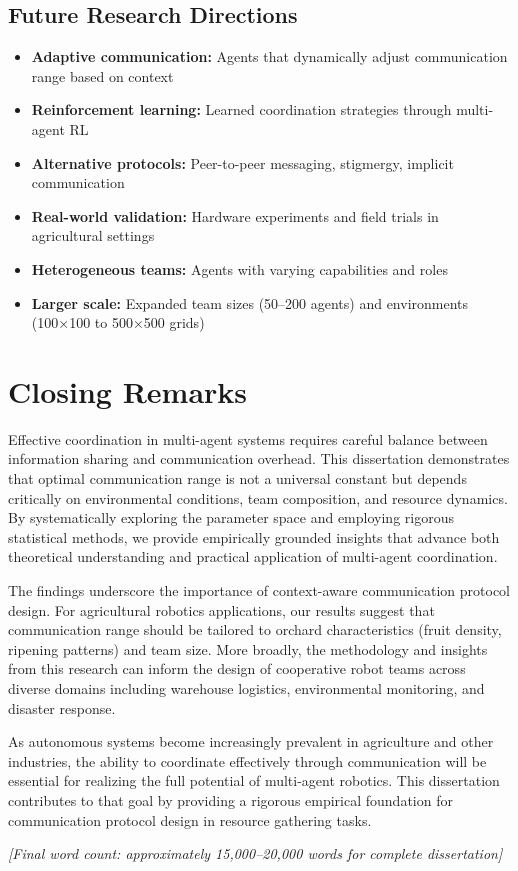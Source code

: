 \subsection{Future Research Directions}

\begin{itemize}
    \item \textbf{Adaptive communication:} Agents that dynamically adjust communication range based on context
    \item \textbf{Reinforcement learning:} Learned coordination strategies through multi-agent RL
    \item \textbf{Alternative protocols:} Peer-to-peer messaging, stigmergy, implicit communication
    \item \textbf{Real-world validation:} Hardware experiments and field trials in agricultural settings
    \item \textbf{Heterogeneous teams:} Agents with varying capabilities and roles
    \item \textbf{Larger scale:} Expanded team sizes (50--200 agents) and environments (100×100 to 500×500 grids)
\end{itemize}

\section{Closing Remarks}

Effective coordination in multi-agent systems requires careful balance between information sharing and communication overhead. This dissertation demonstrates that optimal communication range is not a universal constant but depends critically on environmental conditions, team composition, and resource dynamics. By systematically exploring the parameter space and employing rigorous statistical methods, we provide empirically grounded insights that advance both theoretical understanding and practical application of multi-agent coordination.

The findings underscore the importance of context-aware communication protocol design. For agricultural robotics applications, our results suggest that communication range should be tailored to orchard characteristics (fruit density, ripening patterns) and team size. More broadly, the methodology and insights from this research can inform the design of cooperative robot teams across diverse domains including warehouse logistics, environmental monitoring, and disaster response.

As autonomous systems become increasingly prevalent in agriculture and other industries, the ability to coordinate effectively through communication will be essential for realizing the full potential of multi-agent robotics. This dissertation contributes to that goal by providing a rigorous empirical foundation for communication protocol design in resource gathering tasks.

\textit{[Final word count: approximately 15,000--20,000 words for complete dissertation]}

